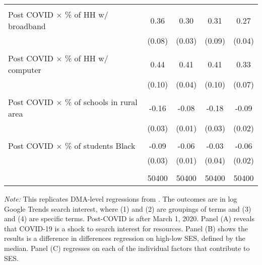 \begin{table}[htbp]
{\begin{tabular*}{1\textwidth}{@{\extracolsep{\fill}}l*{4}{c}}
                    &                     &                     &                     &                     \\
Post COVID $\times$ \% of HH w/ broadband&        0.36\sym{***}&        0.30\sym{***}&        0.31\sym{***}&        0.27\sym{***}\\
                    &      (0.08)         &      (0.03)         &      (0.09)         &      (0.04)         \\
                    &                     &                     &                     &                     \\
Post COVID $\times$ \% of HH w/ computer&        0.44\sym{***}&        0.41\sym{***}&        0.41\sym{***}&        0.33\sym{***}\\
                    &      (0.10)         &      (0.04)         &      (0.10)         &      (0.07)         \\
                    &                     &                     &                     &                     \\
Post COVID $\times$ \% of schools in rural area&       -0.16\sym{***}&       -0.08\sym{***}&       -0.18\sym{***}&       -0.09\sym{***}\\
                    &      (0.03)         &      (0.01)         &      (0.03)         &      (0.02)         \\
                    &                     &                     &                     &                     \\
Post COVID $\times$ \% of students Black&       -0.09\sym{***}&       -0.06\sym{***}&       -0.03         &       -0.06\sym{***}\\
                    &      (0.03)         &      (0.01)         &      (0.04)         &      (0.02)         \\
                    &                     &                     &                     &                     \\
\midrule
& 50400 & 50400 & 50400 & 50400
\end{tabular*}
}
\begin{minipage}{\textwidth}
\footnotesize    \textit{Note:} This replicates DMA-level regressions from \cite{bh1}. The outcomes are in log Google Trends search interest, where (1) and (2) are groupings of terms and (3) and (4) are specific terms. Post-COVID is after March 1, 2020. Panel (A) reveals that COVID-19 is a shock to search interest for resources. Panel (B) shows the results is a difference in differences regression on high-low SES, defined by the median. Panel (C) regresses on each of the individual factors that contribute to SES.
\end{minipage}
\end{table}
